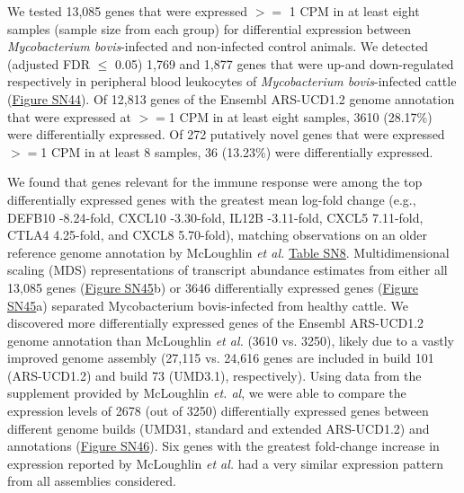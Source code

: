 \documentclass[../main.tex]{subfiles}
\begin{document}
\begin{flushleft}
We tested 13,085 genes that were expressed $>=$ 1 CPM in at least eight samples (sample size from each group) for differential expression between \emph{Mycobacterium bovis}-infected and non-infected control animals. We detected (adjusted FDR $≤$ 0.05) 1,769 and 1,877 genes that were up-and down-regulated respectively in peripheral blood leukocytes of \emph{Mycobacterium bovis}-infected cattle (\hyperlink{Figure SN44}{Figure SN44}). Of 12,813 genes of the Ensembl ARS-UCD1.2 genome annotation that were expressed at $>=$1 CPM in at least eight samples, 3610 (28.17\%) were differentially expressed. Of 272 putatively novel genes that were expressed $>=$1 CPM in at least 8 samples, 36 (13.23\%) were differentially expressed.

\bigskip


We found that genes relevant for the immune response were among the top differentially expressed genes with the greatest mean log-fold change (e.g., DEFB10 -8.24-fold, CXCL10 -3.30-fold, IL12B -3.11-fold, CXCL5 7.11-fold, CTLA4 4.25-fold, and CXCL8 5.70-fold), matching observations on an older reference genome annotation by McLoughlin \emph{et al.} \hyperlink{Table SN8}{Table SN8}. Multidimensional scaling (MDS) representations of transcript abundance estimates from either all 13,085 genes (\hyperlink{Figure SN45}{Figure SN45}b) or 3646 differentially expressed genes (\hyperlink{Figure SN45}{Figure SN45}a) separated Mycobacterium bovis-infected from healthy cattle. We discovered more differentially expressed genes of the Ensembl ARS-UCD1.2 genome annotation than McLoughlin \emph{et al.} (3610 vs. 3250), likely due to a vastly improved genome assembly (27,115 vs. 24,616 genes are included in build 101 (ARS-UCD1.2) and build 73 (UMD3.1), respectively). Using data from the supplement provided by McLoughlin \emph{et. al}, we were able to compare the expression levels of 2678 (out of 3250) differentially expressed genes between different genome builds (UMD31, standard and extended ARS-UCD1.2) and annotations (\hyperlink{Figure SN46}{Figure SN46}). Six genes with the greatest fold-change increase in expression reported by McLoughlin \emph{et al.} had a very similar expression pattern from all assemblies considered.


\bigskip 


\end{flushleft}
\end{document}
